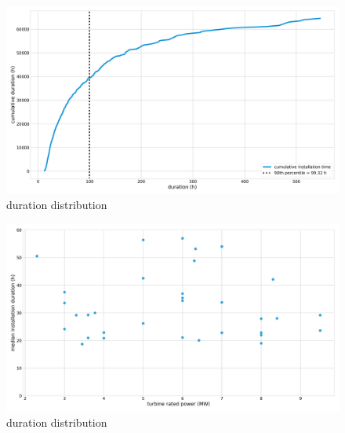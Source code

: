 \documentclass[wes, manuscript]{copernicus}
\begin{document}
\begin{figure}[h]
    \centering
    \includegraphics[width=\textwidth]{figures/cumulative-duration.png}
    \caption{duration distribution}
    \label{fig:cumsum}
\end{figure}

\begin{figure}[h]
    \centering
    \includegraphics[width=\textwidth]{figures/durations-rated-power.png}
    \caption{duration distribution}
    \label{fig:size}
\end{figure}
\conclusions  %


\clearpage
\newpage

\conclusions  %



\end{document}

